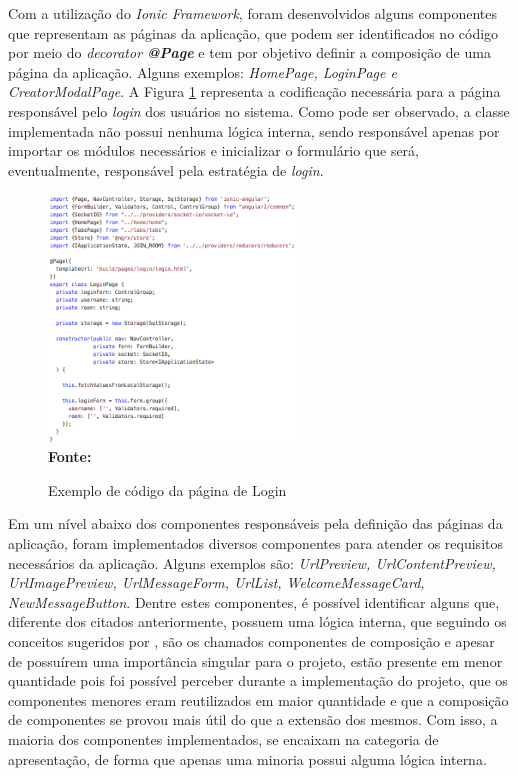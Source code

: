 Com a utilização do\textit{ Ionic Framework}, foram desenvolvidos alguns componentes que representam as páginas da aplicação, que podem ser identificados no código por meio do \textit{decorator \textbf{@Page}} e tem por objetivo definir a composição de uma página da aplicação. Alguns exemplos: \textit{HomePage, LoginPage e CreatorModalPage}. A Figura \ref{fig:figura3} representa a codificação necessária para a página responsável pelo \textit{login} dos usuários no sistema. Como pode ser observado, a classe implementada não possui nenhuma lógica interna, sendo responsável apenas por importar os módulos necessários e inicializar o formulário que será, eventualmente, responsável pela estratégia de \textit{login}.

\begin{figure}[ht]
	\centering	
	\caption[\hspace{0.1cm}Exemplo de código da página de Login.]{Exemplo de código da página de Login}
	\vspace{-0.4cm}
	\includegraphics[width=0.6\textwidth]{figuras/CodigoLogin.png}
	\vspace{-0.2cm}
	\\\textbf{\footnotesize Fonte: \cite{pressman2011} }
	\label{fig:figura3}
\end{figure}
\vspace{-0.5cm}

Em um nível abaixo dos componentes responsáveis pela definição das páginas da aplicação, foram implementados diversos componentes para atender os requisitos necessários da aplicação. Alguns exemplos são: \textit{UrlPreview, UrlContentPreview, UrlImagePreview, UrlMessageForm, UrlList, WelcomeMessageCard, NewMessageButton}. Dentre estes componentes, é possível identificar alguns que, diferente dos citados anteriormente, possuem uma lógica interna, que seguindo os conceitos sugeridos por \cite{presentContainerAbramov}, são os chamados componentes de composição e apesar de possuírem uma importância singular para o projeto, estão presente em menor quantidade pois foi possível perceber durante a implementação do projeto, que os componentes menores eram reutilizados em maior quantidade e que a composição de componentes se provou mais útil do que a extensão dos mesmos. Com isso, a maioria dos componentes implementados, se encaixam na categoria de apresentação, de forma que apenas uma minoria possui alguma lógica interna. 


